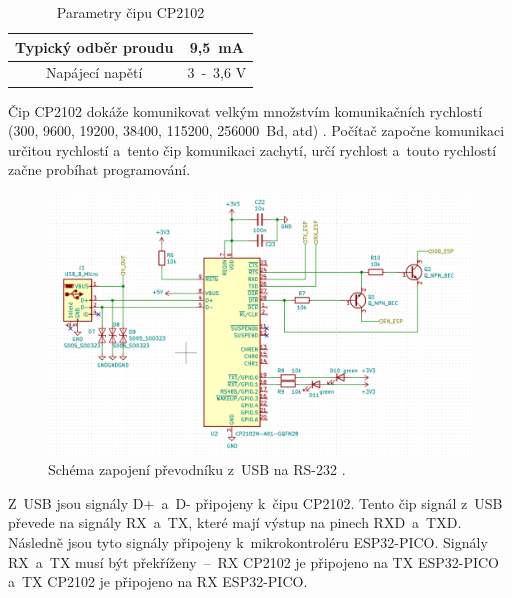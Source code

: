   \begin{table}[!h]
    \caption{Parametry čipu CP2102 \cite{CP2102_datasheet}}
    \begin{center}
        \begin{tabular}{|c|c|}
            \hline
            Typický odběr proudu   & 9,5~mA \\ 
            \hline
            Napájecí napětí        & 3~-~3,6 V \\
            \hline
        \end{tabular}    
    \end{center}
  \end{table}

  Čip CP2102 dokáže komunikovat velkým množstvím komunikačních rychlostí (300, 9600, 19200, 38400, 115200, 256000~Bd, atd) 
  \cite{CP2102_datasheet}. Počítač započne komunikaci určitou rychlostí a~tento čip komunikaci zachytí, určí rychlost 
  a~touto rychlostí začne probíhat programování.

  \begin{figure}[!h]
      \begin{center}
        \includegraphics[scale=0.6]{obrazky/CP2102_schema.png}
      \end{center}
      \caption[Schéma zapojení převodníku z~USB na RS-232 \cite{Devkit_schema}]{Schéma zapojení převodníku z~USB na RS-232 \cite{Devkit_schema}.}
  \end{figure}

  Z~USB jsou signály D+~a~D- připojeny k~čipu CP2102. Tento čip signál z~USB převede na signály RX~a~TX, které mají výstup 
  na pinech RXD~a~TXD. Následně jsou tyto signály připojeny k~mikrokontroléru ESP32-PICO. Signály RX~a~TX musí být překříženy~–~RX 
  CP2102 je připojeno na TX ESP32-PICO a~TX CP2102 je připojeno na RX ESP32-PICO. 

